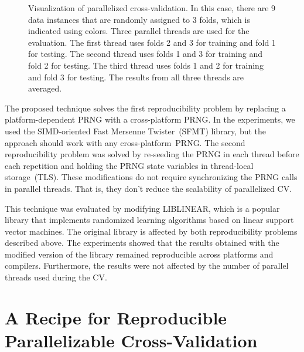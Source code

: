 \begin{figure}
  \caption{\label{fig:CV}
    Visualization of parallelized cross-validation. In this case, there are 9
    data instances that are randomly assigned to 3 folds, which is indicated
    using colors. Three parallel threads are used for the evaluation. The first
    thread uses folds 2 and 3 for training and fold 1 for testing. The second
    thread uses folds 1 and 3 for training and fold 2 for testing. The third
    thread uses folds 1 and 2 for training and fold 3 for testing. The results
    from all three threads are averaged.}
\end{figure}



\smallskip
The proposed technique solves the first reproducibility problem by replacing a
platform-dependent PRNG with a cross-platform PRNG. In the experiments, we used
the SIMD-oriented Fast Mersenne Twister~(SFMT) library\supercite{saito2008simd},
but the approach should work with any cross-platform~PRNG. The second
reproducibility problem was solved by re-seeding the PRNG in each thread before
each repetition and holding the PRNG state variables in thread-local
storage~(TLS). These modifications do not require synchronizing the PRNG calls
in parallel threads. That is, they don't reduce the scalability of
parallelized CV.

\smallskip
This technique was evaluated by modifying LIBLINEAR\supercite{fan2008liblinear},
which is a popular library that implements randomized learning algorithms based on
linear support vector machines\supercite{vapnik1998statistical}. The original
library is affected by both reproducibility problems described above.
The experiments showed that the results obtained with the modified version
of the library remained reproducible across platforms and compilers.
Furthermore, the results were not affected by the number of parallel threads
used during the CV.


\section{A Recipe for Reproducible Parallelizable Cross-\!Validation}


